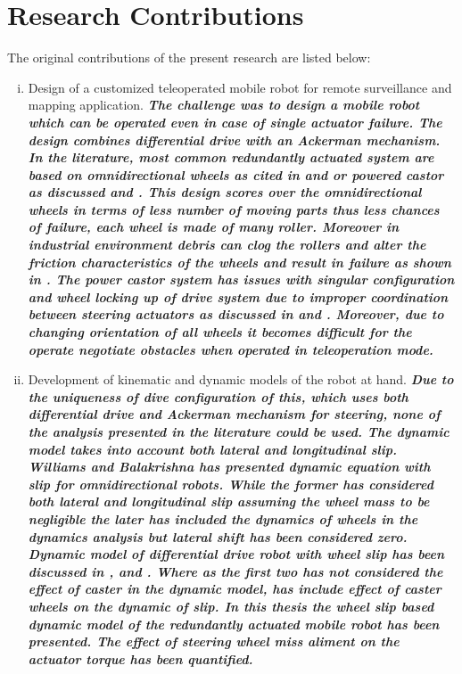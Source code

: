 \section{Research Contributions}
The original contributions of the present research are listed below:
\begin{enumerate}[(i)]

\item Design of a customized teleoperated mobile robot for remote surveillance and mapping application. \textbf{\textit{The challenge was to design a mobile robot which can be operated even in case of single actuator failure. The design combines differential drive with an Ackerman mechanism. In the literature, most common redundantly  actuated system are based on omnidirectional wheels as cited in \cite{muir1987kinematic} and  \cite{saha1995design} or powered castor as discussed \cite{oetomo2008singularity} and \cite{park2002optimal}. This design scores over the omnidirectional wheels in terms of less number  of moving parts thus less chances of failure, each wheel is made of many roller. Moreover in industrial environment debris can clog the rollers and alter the friction characteristics of the wheels and result in failure as shown in \cite{carlson2005ugvs}.   The power castor system has issues with singular configuration and wheel locking up of drive system due to improper coordination between steering actuators as discussed in \cite{oetomo2008singularity} and \cite{low2005kinematic}. Moreover, due to changing orientation of all wheels it becomes difficult for the operate negotiate obstacles when operated in teleoperation mode. } }
\item Development of kinematic and dynamic models of the robot at hand. \textbf{\textit{Due to the uniqueness of dive configuration of this, which uses both differential drive and Ackerman mechanism for steering, none of the analysis presented in the literature could be used. The dynamic model takes into account both lateral and longitudinal slip. Williams\cite{williams2002dynamic}  and Balakrishna  \cite{balakrishna1995modeling} has presented dynamic equation with slip for omnidirectional robots. While the former has considered both lateral and longitudinal slip assuming the wheel mass to be negligible the later has included the dynamics of  wheels in the dynamics analysis but lateral shift has been considered zero. Dynamic model of differential drive robot with wheel slip has been discussed in \cite{tian2009modeling},\cite{sidek2008dynamic}  and \cite{konduri2014effect}. Where as the first two has not considered the effect of caster in the dynamic model, \cite{konduri2014effect} has include effect of caster wheels on the dynamic of slip. In this thesis the wheel slip based dynamic model of the redundantly actuated mobile robot has been presented. The effect of steering wheel  miss aliment on the actuator torque has been quantified. }}    

\end{enumerate}
